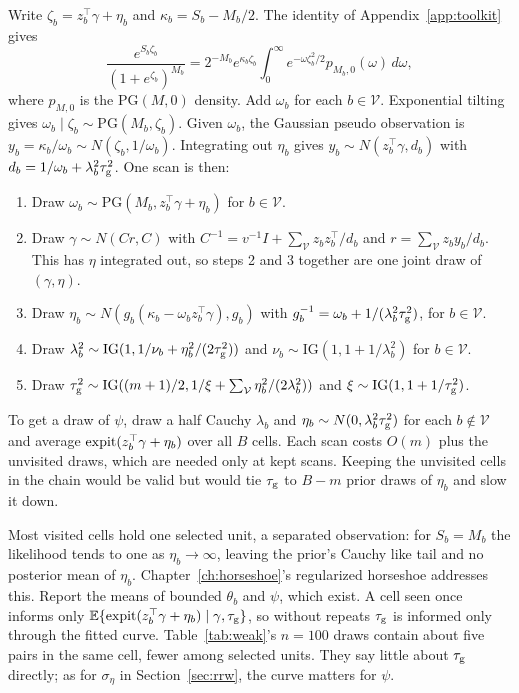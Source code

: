 Write $\zeta_b=z_b^\top\gamma+\eta_b$ and $\kappa_b=S_b-M_b/2$. The identity of Appendix~\ref{app:toolkit} gives
\[
\frac{e^{S_b\zeta_b}}{(1+e^{\zeta_b})^{M_b}}=2^{-M_b}e^{\kappa_b\zeta_b}\int_0^\infty e^{-\omega\zeta_b^2/2}p_{M_b,0}(\omega)\,d\omega,
\]
where $p_{M,0}$ is the $\mathrm{PG}(M,0)$ density. Add $\omega_b$ for each $b\in\mathcal V$. Exponential tilting gives $\omega_b\mid\zeta_b\sim\mathrm{PG}(M_b,\zeta_b)$. Given $\omega_b$, the Gaussian pseudo observation is $y_b=\kappa_b/\omega_b\sim N(\zeta_b,1/\omega_b)$. Integrating out $\eta_b$ gives $y_b\sim N(z_b^\top\gamma,d_b)$ with $d_b=1/\omega_b+\lambda_b^2\tau_{\mathrm{g}}^2$. One scan is then:
\begin{enumerate}
\item Draw $\omega_b \sim \mathrm{PG}(M_b, z_b^\top\gamma + \eta_b)$ for $b \in \mathcal V$.
\item Draw $\gamma \sim N(Cr, C)$ with $C^{-1} = v^{-1}I + \sum_{\mathcal V}z_bz_b^\top/d_b$ and $r = \sum_{\mathcal V}z_by_b/d_b$. This has $\eta$ integrated out, so steps 2 and 3 together are one joint draw of $(\gamma, \eta)$.
\item Draw $\eta_b \sim N(g_b(\kappa_b - \omega_bz_b^\top\gamma), g_b)$ with $g_b^{-1} = \omega_b + 1/(\lambda_b^2\tau_{\mathrm{g}}^2)$, for $b \in \mathcal V$.
\item Draw $\lambda_b^2 \sim \mathrm{IG}(1, 1/\nu_b + \eta_b^2/(2\tau_{\mathrm{g}}^2))$ and $\nu_b \sim \mathrm{IG}(1, 1 + 1/\lambda_b^2)$ for $b \in \mathcal V$.
\item Draw $\tau_{\mathrm{g}}^2 \sim \mathrm{IG}((m + 1)/2, 1/\xi + \sum_{\mathcal V}\eta_b^2/(2\lambda_b^2))$ and $\xi \sim \mathrm{IG}(1, 1 + 1/\tau_{\mathrm{g}}^2)$.
\end{enumerate}
To get a draw of $\psi$, draw a half Cauchy $\lambda_b$ and $\eta_b \sim N(0, \lambda_b^2\tau_{\mathrm{g}}^2)$ for each $b \notin \mathcal V$ and average $\operatorname{expit}(z_b^\top\gamma + \eta_b)$ over all $B$ cells. Each scan costs $O(m)$ plus the unvisited draws, which are needed only at kept scans. Keeping the unvisited cells in the chain would be valid but would tie $\tau_{\mathrm{g}}$ to $B - m$ prior draws of $\eta_b$ and slow it down.

Most visited cells hold one selected unit, a separated observation: for $S_b=M_b$ the likelihood tends to one as $\eta_b\to\infty$, leaving the prior's Cauchy like tail and no posterior mean of $\eta_b$. Chapter~\ref{ch:horseshoe}'s regularized horseshoe addresses this. Report the means of bounded $\theta_b$ and $\psi$, which exist. A cell seen once informs only $\mathbb{E}\{\operatorname{expit}(z_b^\top\gamma+\eta_b)\mid\gamma,\tau_{\mathrm{g}}\}$, so without repeats $\tau_{\mathrm{g}}$ is informed only through the fitted curve. Table~\ref{tab:weak}'s $n=100$ draws contain about five pairs in the same cell, fewer among selected units. They say little about $\tau_{\mathrm{g}}$ directly; as for $\sigma_\eta$ in Section~\ref{sec:rrw}, the curve matters for $\psi$.

